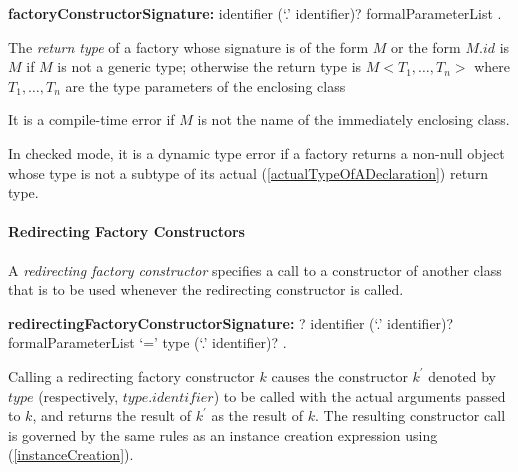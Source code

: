 \documentclass{article}
\begin{document}
\begin{grammar}
{\bf factoryConstructorSignature:}
      \FACTORY{} identifier  (`{\escapegrammar .}' identifier)?  formalParameterList
    .
\end{grammar}



\LMHash{}
The {\em return type} of a factory whose signature is of the form \FACTORY{} $M$ or the form \FACTORY{} $M.id$ is $M$ if $M$ is not a generic type; otherwise the return type is  $M <T_1, \ldots, T_n>$ where $T_1, \ldots, T_n$ are the type parameters of the enclosing class

\LMHash{}
It is a compile-time error if $M$ is not the name of the immediately enclosing class.

\LMHash{}
In checked mode, it is a dynamic type error if a factory returns a non-null object whose type is not a subtype of its actual (\ref{actualTypeOfADeclaration}) return type.



\paragraph{Redirecting Factory Constructors}

\LMHash{}
A {\em redirecting factory constructor} specifies a call to a constructor of another class that is to be used whenever the redirecting constructor is called.

\begin{grammar}
{\bf redirectingFactoryConstructorSignature:}
      \CONST{}? \FACTORY{} identifier (`{\escapegrammar .}' identifier)? formalParameterList `=' type (`{\escapegrammar .}' identifier)?
    .
\end{grammar}

\LMHash{}
Calling a redirecting factory constructor $k$ causes the constructor $k^\prime$ denoted by $type$ (respectively, $type.identifier$) to be called with the actual arguments passed to $k$, and returns the result of $k^\prime$ as the result of $k$.  The resulting constructor call is governed by the same rules as an instance creation expression using \NEW{} (\ref{instanceCreation}).
\end{document}
